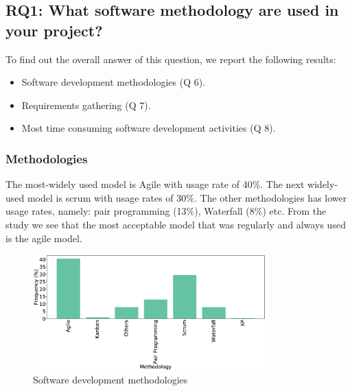\subsection{RQ1: What software methodology are used in your project?}
\label{RQ1}
To find out the overall answer of this question, we report the following results:
\begin{itemize}
\item Software development methodologies (Q 6).
\item Requirements gathering (Q 7).
\item Most time consuming software development activities (Q 8).
\end{itemize}

\subsubsection{Methodologies}
The most-widely used model is Agile with usage rate of 40\%. The next widely-used model is scrum with usage rates of 30\%. The other methodologies has lower usage rates, namely: pair programming (13\%), Waterfall (8\%) etc. From the study we see that the most acceptable model that was regularly and always used is the agile model.
\begin{figure}[]
\centering
  \includegraphics[width=0.8\textwidth]{Figures/Respondents_Methodology}
  \caption{Software development methodologies}
  \label{fig:methodologies}
\end{figure}

